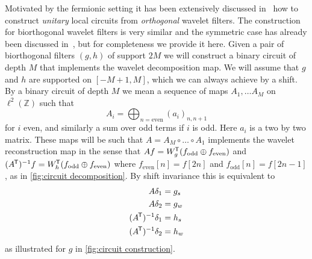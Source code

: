 \documentclass[submission, Phys]{SciPost}
\theoremstyle{definition}
\theoremstyle{remark}
\newcommand{\ZZ}{\mathbb Z}
\newcommand{\op}{\oplus}
\newcommand*{\tran}{{\mkern-1.5mu\mathsf{T}}}
\begin{document}
\begin{appendix}
Motivated by the fermionic setting it has been extensively discussed in~\cite{evenbly2018representation} how to construct \emph{unitary} local circuits from \emph{orthogonal} wavelet filters.
The construction for biorthogonal wavelet filters is very similar and the symmetric case has already been discussed in~\cite{evenbly2018representation}, but for completeness we provide it here.
Given a pair of biorthogonal filters $(g,h)$ of support $2M$ we will construct a binary circuit of depth $M$ that implements the wavelet decomposition map.
We will assume that $g$ and $h$ are supported on $[-M + 1, M]$, which we can always achieve by a shift.
By a binary circuit of depth $M$ we mean a sequence of maps $A_1, \ldots A_M$ on $\ell^2(\ZZ)$ such that
\begin{equation*}
  A_i = \bigoplus_{n = \text{even}} (a_i)_{n,n+1}
\end{equation*}
for $i$ even, and similarly a sum over odd terms if $i$ is odd.
Here $a_i$ is a two by two matrix.
These maps will be such that $A = A_M \circ \ldots \circ A_1$ implements the wavelet reconstruction map in the sense that $A f = W_g^{\tran}(f_{\text{odd}} \op f_{\text{even}})$ and $(A^\tran)^{-1} f = W_h^{\tran}(f_{\text{odd}} \op f_{\text{even}})$ where $f_{\text{even}}[n] = f[2n]$ and $f_{\text{odd}}[n] = f[2n-1]$, as in \cref{fig:circuit decomposition}.
By shift invariance this is equivalent to
\begin{equation}\begin{aligned}\label{eq:classical circuit}
  A \delta_1 &= g_s \\
  A \delta_2 &= g_w \\
  (A^\tran)^{-1} \delta_1 &= h_s \\
  (A^\tran)^{-1} \delta_2 &= h_w
\end{aligned}\end{equation}
as illustrated for $g$ in \cref{fig:circuit construction}.
\begin{figure}%
\centering
\quad{}
\quad{}
\end{figure}
\end{appendix}
\end{document}
